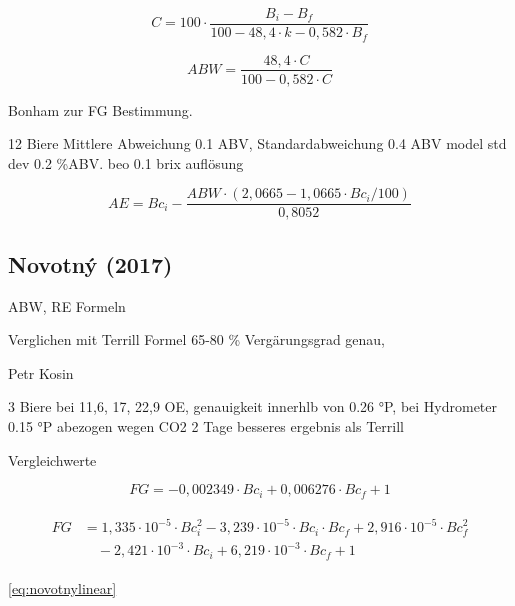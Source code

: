 \documentclass[a4paper,parskip=half]{scrartcl}
\newcommand{\bxi}{\mathit{B}_i}
\newcommand{\bxic}{\mathit{Bc}_i}
\newcommand{\bxf}{\mathit{B}_f}
\newcommand{\bxfc}{\mathit{Bc}_f}
\newcommand{\fg}{\mathit{FG}}
\newcommand{\abw}{\mathit{ABW}}
\newcommand{\aex}{\mathit{AE}}
\begin{document}
\begin{equation}
C = 100 \cdot \frac{\bxi - \bxf}{100 - 48,4 \cdot k - 0,582 \cdot \bxf}
\end{equation}

\begin{equation}
\abw = \frac{48,4 \cdot C}{100 - 0,582 \cdot C}
\label{eq:gossett} 
\end{equation}

Bonham zur FG Bestimmung.

12 Biere Mittlere Abweichung 0.1 ABV, Standardabweichung 0.4 ABV
model std dev 0.2 \%ABV. beo 0.1 brix auflösung

\autocite{Gossett2012c}

\begin{equation}
\aex = \bxic - \frac{\abw \cdot (2,0665 - 1,0665 \cdot \bxic / 100)}{0,8052}
\end{equation}

\subsection*{Novotný (2017)}

ABW, RE Formeln

Verglichen mit Terrill Formel 65-80 \% Vergärungsgrad genau,

Petr Kosin

3 Biere bei 11,6, 17, 22,9 OE, genauigkeit innerhlb von
0.26 °P, bei Hydrometer 0.15 °P abezogen wegen CO2
2 Tage besseres ergebnis als Terrill
\autocite{Novotny2017}

Vergleichwerte
\autocite{Novotny2017a}


\begin{equation} 
\fg = -0,002349 \cdot \bxic + 0,006276 \cdot \bxfc + 1
\label{eq:novotnylinear} 
\end{equation}

\begin{align}
\begin{split}
\fg &= 1,335 \cdot 10^{-5} \cdot \bxic^2 - 3,239 \cdot 10^{-5} \cdot \bxic \cdot \bxfc + 2,916 \cdot 10^{-5} \cdot \bxfc^2 \\
& \quad - 2,421 \cdot 10^{-3} \cdot \bxic + 6,219 \cdot 10^{-3} \cdot \bxfc + 1
\end{split} \label{eq:novotnyquadratic} 
\end{align}

\autoref{eq:novotnylinear}

\end{document}
